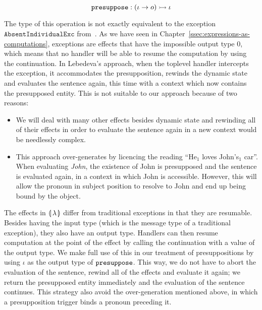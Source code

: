 $$
\mathtt{presuppose} : (\iota \to o) \rightarrowtail \iota
$$

The type of this operation is not exactly equivalent to the exception
$\texttt{AbsentIndividualExc}$ from~\cite{lebedeva2012expression}. As we
have seen in Chapter~\ref{ssec:expressions-as-computations}, exceptions are
effects that have the impossible output type $0$, which means that no
handler will be able to resume the computation by using the
continuation. In Lebedeva's approach, when the toplevel handler intercepts
the exception, it accommodates the presupposition, rewinds the dynamic
state and evaluates the sentence again, this time with a context which now
contains the presupposed entity. This is not suitable to our approach
because of two reasons:

\begin{itemize}
\item We will deal with many other effects besides dynamic state and
  rewinding all of their effects in order to evaluate the sentence again in
  a new context would be needlessly complex.
\item This approach over-generates by licencing the reading ``He$_1$ loves
  John's$_1$ car''. When evaluating \emph{John}, the existence of John is
  presupposed and the sentence is evaluated again, in a context in which
  John is accessible. However, this will allow the pronoun in subject
  position to resolve to John and end up being bound by the object.
\end{itemize}

The effects in $\llparenthesis \, \lambda \, \rrparenthesis$ differ from traditional exceptions in
that they are resumable. Besides having the input type (which is the
message type of a traditional exception), they also have an output
type. Handlers can then resume computation at the point of the effect by
calling the continuation with a value of the output type. We make full use
of this in our treatment of presuppositions by using $\iota$ as the output
type of $\mathtt{presuppose}$. This way, we do not have to abort the evaluation
of the sentence, rewind all of the effects and evaluate it again; we return
the presupposed entity immediately and the evaluation of the sentence
continues. This strategy also avoid the over-generation mentioned above, in
which a presupposition trigger binds a pronoun preceding it.


